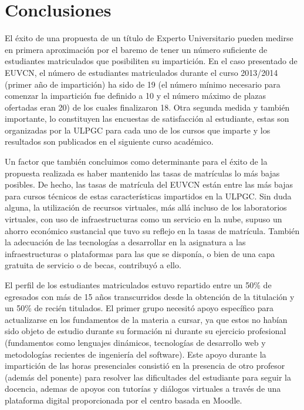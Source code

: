 \documentclass[conference]{IEEEtran}
\begin{document}
\section{Conclusiones \label{sec:conclusiones}}

El éxito de una propuesta de un título de Experto Universitario pueden medirse
en primera aproximación por el baremo de tener un número suficiente de
estudiantes matriculados que posibiliten su impartición. En el caso presentado
de EUVCN, el número de estudiantes matriculados durante el curso 2013/2014
(primer año de impartición) ha sido  de 19 (el número mínimo necesario para
comenzar la impartición fue definido a
10 y  el número máximo de plazas ofertadas eran 20) de los cuales finalizaron
18. Otra
segunda medida y también importante, lo constituyen las encuestas de
satisfacción al estudiante, estas son organizadas por la ULPGC para cada uno de los cursos que imparte y los resultados son publicados en el siguiente curso académico.

Un factor que también concluimos como determinante para el éxito de la
propuesta realizada es haber mantenido las tasas de matrículas lo más bajas
posibles. De hecho, las tasas de matrícula del EUVCN están entre las más bajas
para cursos técnicos de estas características impartidos en la ULPGC. Sin duda
alguna, la utilización de recursos virtuales, más allá incluso de los
laboratorios virtuales, con uso de infraestructuras como un servicio en la
nube, supuso un ahorro económico sustancial que tuvo su reflejo en la tasas de
matrícula. También la adecuación de las tecnologías a desarrollar en la asignatura a
las infraestructuras o plataformas para las que se disponía, o bien de una
capa gratuita de servicio o de becas, contribuyó a ello.

El perfil de los estudiantes matriculados estuvo repartido entre un
50\% de egresados con más de 15 años transcurridos desde la obtención de la
titulación y un 50\% de recién titulados.
El primer grupo necesitó apoyo específico para actualizarse en los fundamentos
de la materia a cursar, ya que estos no habían sido objeto de estudio durante su
formación ni durante su ejercicio profesional (fundamentos como lenguajes
dinámicos, tecnologías de desarrollo web y metodologías recientes de ingeniería
del software). Este apoyo durante la impartición de las horas presenciales
consistió en la presencia de otro profesor (además del ponente) para resolver
las dificultades del estudiante para seguir la docencia, ademas de apoyos con
tutorías y diálogos virtuales a través de una plataforma digital proporcionada
por el centro basada en Moodle.
\end{document}
